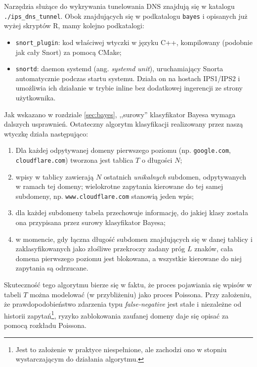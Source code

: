\documentclass{eiti-raport}
\begin{document}
Narzędzia służące do wykrywania tunelowania DNS znajdują się w katalogu \texttt{./ips\_dns\_tunnel}. Obok znajdujących się w podkatalogu \texttt{bayes} i opisanych już wyżej skryptów R, mamy kolejno podkatalogi:
\begin{itemize}
	\item \texttt{snort\_plugin}: kod właściwej wtyczki w języku C++, kompilowany (podobnie jak cały Snort) za pomocą CMake;
	\item \texttt{snortd}: daemon systemd (ang. \emph{systemd unit}), uruchamiający Snorta automatycznie podczas startu systemu. Działa on na hostach IPS1/IPS2 i umożliwia ich działanie w trybie inline bez dodatkowej ingerencji ze strony użytkownika. 
\end{itemize} 
Jak wskazano w rozdziale \ref{sec:bayes}, ,,surowy'' klasyfikator Bayesa wymaga dalszych usprawnień. Ostateczny algorytm klasyfikacji realizowany przez naszą wtyczkę działa następująco:
\begin{enumerate}
	\item Dla każdej odpytywanej domeny pierwszego poziomu (np. \texttt{google.com}, \texttt{cloudflare.com}) tworzona jest tablica $T$ o długości $N$;
	\item wpisy w tablicy zawierają $N$ ostatnich \emph{unikalnych} subdomen, odpytywanych w ramach tej domeny; wielokrotne zapytania kierowane do tej samej subdomeny, np. \texttt{www.cloudflare.com} stanowią jeden wpis;
	\item dla każdej subdomeny tabela przechowuje informację, do jakiej klasy została ona przypisana przez surowy klasyfikator Bayesa;
	\item w momencie, gdy łączna długość subdomen znajdujących się w danej tablicy i zaklasyfikowanych jako złośliwe przekroczy zadany próg $L$ znaków, cała domena pierwszego poziomu jest blokowana, a wszystkie kierowane do niej zapytania są odrzucane.
\end{enumerate}
Skuteczność tego algorytmu bierze się w faktu, że proces pojawiania się wpisów w tabeli $T$ można modelować (w przybliżeniu) jako proces Poissona. Przy założeniu, że prawdopodobieństwo zdarzenia typu \emph{false-negative} jest stałe i niezależne od historii zapytań\footnote{Jest to założenie w praktyce niespełnione, ale zachodzi ono w stopniu wystarczającym do działania algorytmu.}, ryzyko zablokowania zaufanej domeny daje się opisać za pomocą rozkładu Poissona.
\end{document}
